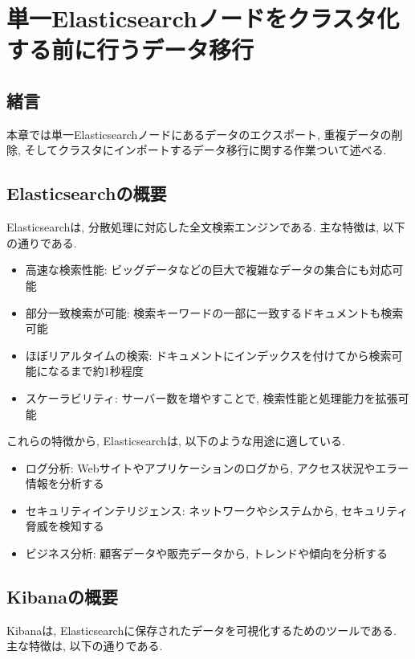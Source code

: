 
\chapter{単一Elasticsearchノードをクラスタ化する前に行うデータ移行}
\label{chap:third}

\section{緒言}
本章では単一Elasticsearchノードにあるデータのエクスポート, 重複データの削除, そしてクラスタにインポートするデータ移行に関する作業ついて述べる.

\section{Elasticsearchの概要}
Elasticsearchは, 分散処理に対応した全文検索エンジンである. 主な特徴は, 以下の通りである.

\begin{itemize}
  \item 高速な検索性能: ビッグデータなどの巨大で複雑なデータの集合にも対応可能
  \item 部分一致検索が可能: 検索キーワードの一部に一致するドキュメントも検索可能
  \item ほぼリアルタイムの検索: ドキュメントにインデックスを付けてから検索可能になるまで約1秒程度
  \item スケーラビリティ: サーバー数を増やすことで, 検索性能と処理能力を拡張可能
\end{itemize}

これらの特徴から, Elasticsearchは, 以下のような用途に適している.

\begin{itemize}
  \item ログ分析: Webサイトやアプリケーションのログから, アクセス状況やエラー情報を分析する
  \item セキュリティインテリジェンス: ネットワークやシステムから, セキュリティ脅威を検知する
  \item ビジネス分析: 顧客データや販売データから, トレンドや傾向を分析する
\end{itemize}

\section{Kibanaの概要}

Kibanaは, Elasticsearchに保存されたデータを可視化するためのツールである. 主な特徴は, 以下の通りである.

